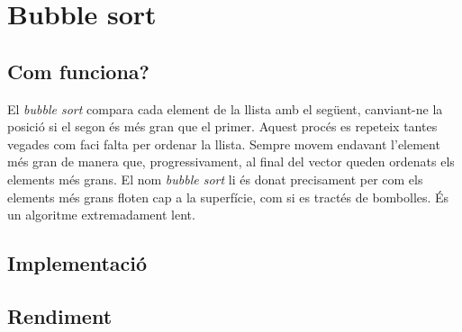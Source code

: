 \chapter{Bubble sort}

\section{Com funciona?}
El \textit{bubble sort} compara cada element de la llista amb el següent, canviant-ne la posició si el segon és més gran que el primer.
Aquest procés es repeteix tantes vegades com faci falta per ordenar la llista.
Sempre movem endavant l'element més gran de manera que, progressivament, al final del vector queden ordenats els elements més grans.
El nom \textit{bubble sort} li és donat precisament per com els elements més grans floten cap a la superfície, com si es tractés de bombolles.
És un algoritme extremadament lent.

\section{Implementació}

\vspace{1em}

\begin{minipage}{\textwidth}
	\section{Rendiment}
	\noindent
	\makebox[\textwidth][c]{
		
		}
	\vspace*{1em}
	\begin{center}
		\resizebox{\textwidth}{!}{}
	\end{center}
\end{minipage}